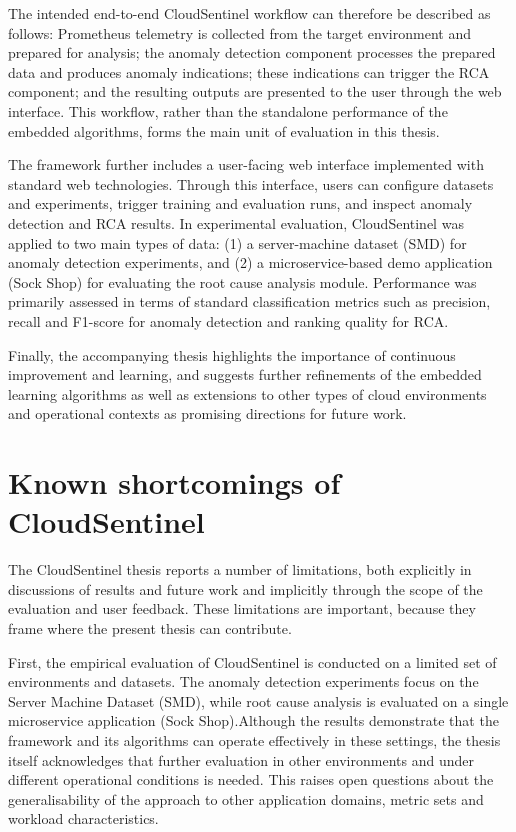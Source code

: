 The intended end-to-end CloudSentinel workflow can therefore be described as follows: Prometheus telemetry is collected from the target environment and prepared for analysis; the anomaly detection component processes the prepared data and produces anomaly indications; these indications can trigger the RCA component; and the resulting outputs are presented to the user through the web interface. This workflow, rather than the standalone performance of the embedded algorithms, forms the main unit of evaluation in this thesis.

The framework further includes a user-facing web interface implemented with standard web technologies. Through this interface, users can configure datasets and experiments, trigger training and evaluation runs, and inspect anomaly detection and RCA results. In experimental evaluation, CloudSentinel was applied to two main types of data: (1) a server-machine dataset (SMD) for anomaly detection experiments, and (2) a microservice-based demo application (Sock Shop) for evaluating the root cause analysis module. Performance was primarily assessed in terms of standard classification metrics such as precision, recall and F1-score for anomaly detection and ranking quality for RCA.

Finally, the accompanying thesis highlights the importance of continuous improvement and learning, and suggests further refinements of the embedded learning algorithms as well as extensions to other types of cloud environments and operational contexts as promising directions for future work.

\section{Known shortcomings of CloudSentinel}

The CloudSentinel thesis reports a number of limitations, both explicitly in discussions of results and future work and implicitly through the scope of the evaluation and user feedback. These limitations are important, because they frame where the present thesis can contribute.

First, the empirical evaluation of CloudSentinel is conducted on a limited set of environments and datasets. The anomaly detection experiments focus on the Server Machine Dataset (SMD), while root cause analysis is evaluated on a single microservice application (Sock Shop).Although the results demonstrate that the framework and its algorithms can operate effectively in these settings, the thesis itself acknowledges that further evaluation in other environments and under different operational conditions is needed. This raises open questions about the generalisability of the approach to other application domains, metric sets and workload characteristics.

